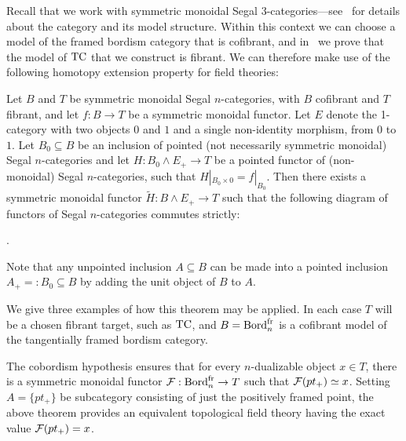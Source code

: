 \documentclass{amsart}
\begin{document}
Recall that we work with symmetric monoidal Segal $3$-categories---see~\cite{3TC} for details about the category and its model structure.  Within this context we can choose a model of the framed bordism category that is cofibrant, and in~\cite{3TC} we prove that the model of $\mathrm{TC}$ that we construct is fibrant.  We can therefore make use of the following homotopy extension property for field theories:
\begin{apptheorem}[\cite{3TC}] \label{thm:HEP}
	Let $B$ and $T$ be symmetric monoidal Segal $n$-categories, with $B$ cofibrant and $T$ fibrant, and let $f: B  \to T$ be a symmetric monoidal functor. Let $E$ denote the 1-category with two objects $0$ and $1$ and a single non-identity morphism, from $0$ to $1$.  Let  $B_0 \subseteq B$ be an inclusion of pointed (not necessarily symmetric monoidal) Segal $n$-categories and let $H: B_0 \wedge E_+ \to T$ be a pointed functor of (non-monoidal) Segal $n$-categories, such that $H |_{B_0 \times 0} = f|_{B_0}$.
Then there exists a symmetric monoidal functor $\tilde{H}: B \wedge E_+ \to T$ such that the following diagram of functors of Segal $n$-categories commutes strictly:
	\begin{center}
	.
	\end{center}
\end{apptheorem}

Note that any unpointed inclusion $A \subseteq B$ can be made into a pointed inclusion $A_+ =: B_0 \subseteq B$ by adding the unit object of $B$ to $A$. 

We give three examples of how this theorem may be applied. In each case $T$ will be a chosen fibrant target, such as $\mathrm{TC}$, and $B = \mathrm{Bord}^\mathrm{fr}_n$ is a cofibrant model of the tangentially framed bordism category.

\begin{appexample}
	The cobordism hypothesis ensures that for every $n$-dualizable object $x \in T$, there is a symmetric monoidal functor $\mathcal F: \mathrm{Bord}^\mathrm{fr}_n \to T$ such that $\mathcal F(pt_+) \simeq x$. Setting $A = \{ pt_+ \}$ be subcategory consisting of just the positively framed point, the above theorem provides an equivalent topological field theory having the exact value $\mathcal F(pt_+) = x$. 	
\end{appexample}
\end{document}
